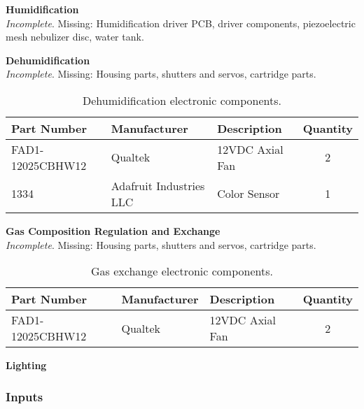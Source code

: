 \clearpage

\textbf{Humidification}\\
\textit{Incomplete}. Missing: Humidification driver PCB, driver components, piezoelectric mesh nebulizer disc, water tank.

\textbf{Dehumidification}\\
\textit{Incomplete}. Missing: Housing parts, shutters and servos, cartridge parts.
\begin{table}[!ht]
    \centering
    \begin{tabular}{|l|l|l|c|}
    \hline
        Part Number         & Manufacturer              & Description       & Quantity  \\ \hline
        FAD1-12025CBHW12    & Qualtek                   & 12VDC Axial Fan   & 2         \\ \hline
        1334                & Adafruit Industries LLC   & Color Sensor      & 1         \\ \hline
    \end{tabular}
    \caption{Dehumidification electronic components.}
    \label{tab:dehumidification_components}
\end{table}

\textbf{Gas Composition Regulation and Exchange}\\
\textit{Incomplete}. Missing: Housing parts, shutters and servos, cartridge parts.
\begin{table}[!ht]
    \centering
    \begin{tabular}{|l|l|l|c|}
    \hline
        Part Number         & Manufacturer              & Description                       & Quantity  \\ \hline
        FAD1-12025CBHW12    & Qualtek                   & 12VDC Axial Fan                   & 2         \\ \hline
    \end{tabular}
    \caption{Gas exchange electronic components.}
    \label{tab:gas_components}
\end{table}

\clearpage

\textbf{Lighting}\\

\clearpage

\subsubsection{Inputs}

